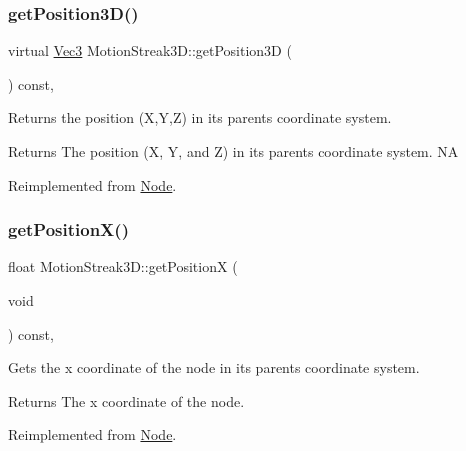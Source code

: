 \subsubsection{\texorpdfstring{get\+Position3\+D()}{getPosition3D()}\hspace{0.1cm}{\footnotesize\ttfamily [2/2]}}
{\footnotesize\ttfamily virtual \hyperlink{classVec3}{Vec3} Motion\+Streak3\+D\+::get\+Position3D (\begin{DoxyParamCaption}{ }\end{DoxyParamCaption}) const\hspace{0.3cm}{\ttfamily [override]}, {\ttfamily [virtual]}}

Returns the position (X,Y,Z) in its parent\textquotesingle{}s coordinate system.

\begin{DoxyReturn}{Returns}
The position (X, Y, and Z) in its parent\textquotesingle{}s coordinate system.  NA 
\end{DoxyReturn}


Reimplemented from \hyperlink{classNode_a8617dd2eb9af75a66ebaff0d3c99285e}{Node}.

\mbox{\label{classMotionStreak3D_a2dcc5baf8956d2fef986b564bc21ff5c}} 
\subsubsection{\texorpdfstring{get\+Position\+X()}{getPositionX()}\hspace{0.1cm}{\footnotesize\ttfamily [1/2]}}
{\footnotesize\ttfamily float Motion\+Streak3\+D\+::get\+PositionX (\begin{DoxyParamCaption}\item[{void}]{ }\end{DoxyParamCaption}) const\hspace{0.3cm}{\ttfamily [override]}, {\ttfamily [virtual]}}

Gets the x coordinate of the node in its parent\textquotesingle{}s coordinate system.

\begin{DoxyReturn}{Returns}
The x coordinate of the node. 
\end{DoxyReturn}


Reimplemented from \hyperlink{classNode_ad4b27cd8bc98960789fbd2b574666a25}{Node}.

